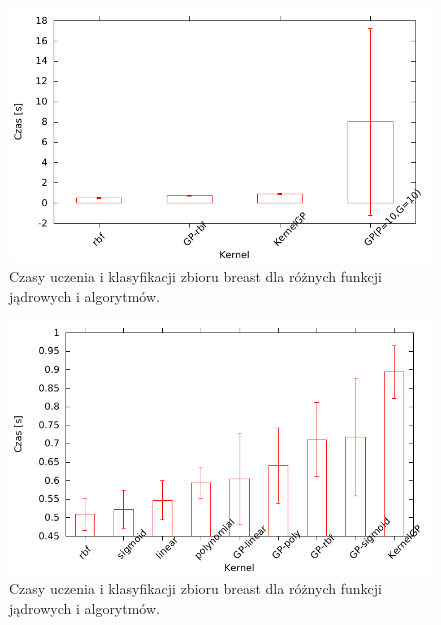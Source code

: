 \begin{figure}
	\includegraphics[scale=0.60]{figures/results/time/time-breast}
	\caption{Czasy uczenia i klasyfikacji zbioru breast dla różnych funkcji jądrowych i algorytmów. \label{fig:time-some-breast}}
\end{figure} 

\begin{figure}
	\includegraphics[scale=0.60]{figures/results/time/time_almost_all_breast}
	\caption{Czasy uczenia i klasyfikacji zbioru breast dla różnych funkcji jądrowych i algorytmów. \label{fig:time-all-breast}}
\end{figure} 


